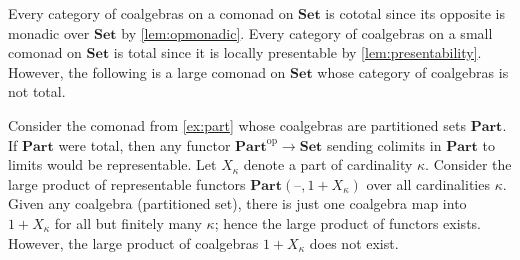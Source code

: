 \documentclass[11pt, oneside, article]{memoir}
\theoremstyle{plain}
\theoremstyle{definition}
\theoremstyle{remark}
\newenvironment{counterexample}
{\renewcommand\qedsymbol{$\lrcorner$}%
  \pushQED{\qed}\mycounterexample}
{\popQED\endmycounterexample}
\DeclareMathOperator{\ophelper}{op}
\newcommand{\dash}{{\mathord{\text{--}}}}
\newcommand{\op}{^{\ophelper}}
\newcommand{\ot}{\leftarrow}
\newcommand{\xto}[1]{\xrightarrow{#1}}
\newcommand{\xot}[1]{\xleftarrow{#1}}
\newcommand{\namedcat}[1]{\mathbf{#1}}
\newcommand{\Set}{\namedcat{Set}}
\newcommand{\Part}{\namedcat{Part}}
\newcommand{\Shear}{\namedcat{Shear}}
\newcommand{\DirectedShear}{\namedcat{DirectedShear}}
\newcommand{\xX}{X}
\newcommand{\anote}[1]{{\color{red!80!black}$\lozenge$\qquad Aaron says: #1\qquad$\lozenge$}}
\begin{document}
  

Every category of coalgebras on a comonad on $\Set$ is cototal since
its opposite is monadic over $\Set$ by \cref{lem:opmonadic}. Every
category of coalgebras on a small comonad on $\Set$ is total since it
is locally presentable by \cref{lem:presentability}. However, the
following is a large comonad on $\Set$ whose category of coalgebras is
not total.

\begin{counterexample}[Non-total comonad]
  Consider the comonad from \cref{ex:part} whose coalgebras are
  partitioned sets $\Part$. If $\Part$ were total, then any functor
  $\Part\op \to \Set$ sending colimits in $\Part$ to limits would be
  representable. Let $\xX_\kappa$ denote a part of cardinality
  $\kappa$. Consider the large product of representable functors
  $\Part(\dash, 1 + \xX_\kappa)$ over all cardinalities $\kappa$. Given
  any coalgebra (partitioned set), there is just one coalgebra map
  into $1 + \xX_\kappa$ for all but finitely many $\kappa$; hence the
  large product of functors exists. However, the large product of
  coalgebras $1 + \xX_\kappa$ does not exist.
\end{counterexample}
\end{document}
